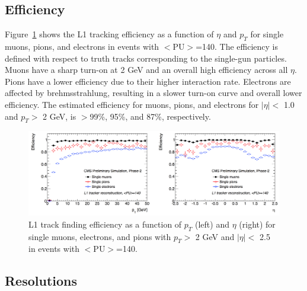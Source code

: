 \documentclass{PoS}
\begin{document}
\subsection{Efficiency}

Figure~\ref{fig:Efficiency} shows the L1 tracking efficiency as a function of $\eta$ and $p_T$ for single muons, pions, and electrons in events with $<$PU$>$=140. The efficiency is defined with respect to truth tracks corresponding to the single-gun particles. Muons have a sharp turn-on at 2 GeV and an overall high efficiency across all $\eta$. Pions have a lower efficiency due to their higher interaction rate. Electrons are affected by brehmsstrahlung, resulting in a slower turn-on curve and overall lower efficiency. The estimated efficiency for muons, pions, and electrons for $|\eta| <$ 1.0 and $p_T >$ 2 GeV, is $>$99\%, 95\%, and 87\%, respectively.
\begin{figure}[h!]
  \centering
	\includegraphics[width=\textwidth]{Figures/Efficiency.png}
	\caption{L1 track finding efficiency as a function of $p_T$ (left) and $\eta$ (right) for single muons, electrons, and pions with $p_T >$ 2 GeV and $|\eta| <$ 2.5 in events with $<$PU$>$=140.}
	\label{fig:Efficiency}
\end{figure}

\subsection{Resolutions}
\end{document}

